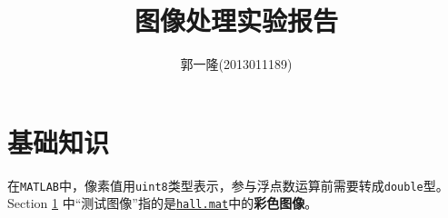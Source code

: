 \documentclass{article}
\author{郭一隆(2013011189)}
\title{图像处理实验报告}
\numberwithin{figure}{section}
\numberwithin{table}{section}
\numberwithin{listing}{section}
\begin{document}
    \maketitle

    \tableofcontents
    \newpage

    \listoffigures
    \listoftables
    \newpage

    \renewcommand\listoflistingscaption{List of source codes}
    \listoflistings
    \newpage

    \section{基础知识} %
    \label{sec:基础知识}

        在\texttt{MATLAB}中，像素值用\texttt{uint8}类型表示，参与浮点数运算前需要转成\texttt{double}型。Section \ref{sec:基础知识} 中“测试图像”指的是\href{run:../resource/hall.mat}{\texttt{hall.mat}}中的\textbf{彩色图像}。
\end{document}
